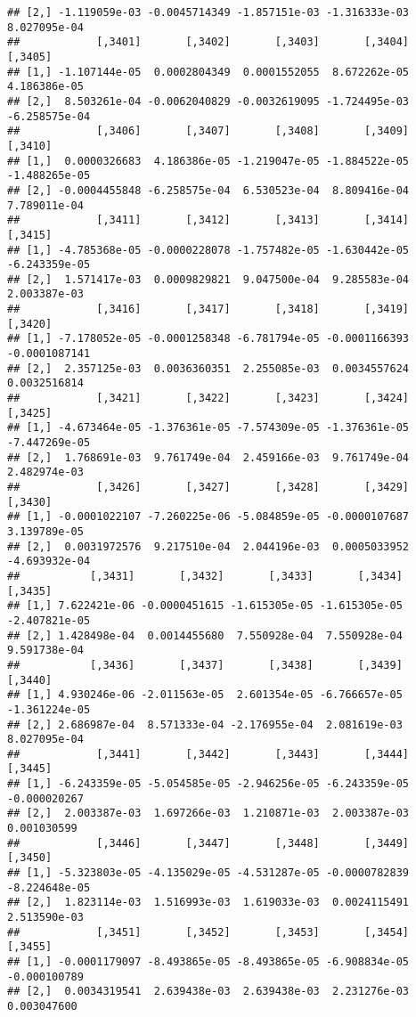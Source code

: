 \documentclass[
]{article}
\begin{document}
\begin{verbatim}
## [2,] -1.119059e-03 -0.0045714349 -1.857151e-03 -1.316333e-03  8.027095e-04
##            [,3401]       [,3402]       [,3403]       [,3404]       [,3405]
## [1,] -1.107144e-05  0.0002804349  0.0001552055  8.672262e-05  4.186386e-05
## [2,]  8.503261e-04 -0.0062040829 -0.0032619095 -1.724495e-03 -6.258575e-04
##            [,3406]       [,3407]       [,3408]       [,3409]       [,3410]
## [1,]  0.0000326683  4.186386e-05 -1.219047e-05 -1.884522e-05 -1.488265e-05
## [2,] -0.0004455848 -6.258575e-04  6.530523e-04  8.809416e-04  7.789011e-04
##            [,3411]       [,3412]       [,3413]       [,3414]       [,3415]
## [1,] -4.785368e-05 -0.0000228078 -1.757482e-05 -1.630442e-05 -6.243359e-05
## [2,]  1.571417e-03  0.0009829821  9.047500e-04  9.285583e-04  2.003387e-03
##            [,3416]       [,3417]       [,3418]       [,3419]       [,3420]
## [1,] -7.178052e-05 -0.0001258348 -6.781794e-05 -0.0001166393 -0.0001087141
## [2,]  2.357125e-03  0.0036360351  2.255085e-03  0.0034557624  0.0032516814
##            [,3421]       [,3422]       [,3423]       [,3424]       [,3425]
## [1,] -4.673464e-05 -1.376361e-05 -7.574309e-05 -1.376361e-05 -7.447269e-05
## [2,]  1.768691e-03  9.761749e-04  2.459166e-03  9.761749e-04  2.482974e-03
##            [,3426]       [,3427]       [,3428]       [,3429]       [,3430]
## [1,] -0.0001022107 -7.260225e-06 -5.084859e-05 -0.0000107687  3.139789e-05
## [2,]  0.0031972576  9.217510e-04  2.044196e-03  0.0005033952 -4.693932e-04
##           [,3431]       [,3432]       [,3433]       [,3434]       [,3435]
## [1,] 7.622421e-06 -0.0000451615 -1.615305e-05 -1.615305e-05 -2.407821e-05
## [2,] 1.428498e-04  0.0014455680  7.550928e-04  7.550928e-04  9.591738e-04
##           [,3436]       [,3437]       [,3438]       [,3439]       [,3440]
## [1,] 4.930246e-06 -2.011563e-05  2.601354e-05 -6.766657e-05 -1.361224e-05
## [2,] 2.686987e-04  8.571333e-04 -2.176955e-04  2.081619e-03  8.027095e-04
##            [,3441]       [,3442]       [,3443]       [,3444]      [,3445]
## [1,] -6.243359e-05 -5.054585e-05 -2.946256e-05 -6.243359e-05 -0.000020267
## [2,]  2.003387e-03  1.697266e-03  1.210871e-03  2.003387e-03  0.001030599
##            [,3446]       [,3447]       [,3448]       [,3449]       [,3450]
## [1,] -5.323803e-05 -4.135029e-05 -4.531287e-05 -0.0000782839 -8.224648e-05
## [2,]  1.823114e-03  1.516993e-03  1.619033e-03  0.0024115491  2.513590e-03
##            [,3451]       [,3452]       [,3453]       [,3454]      [,3455]
## [1,] -0.0001179097 -8.493865e-05 -8.493865e-05 -6.908834e-05 -0.000100789
## [2,]  0.0034319541  2.639438e-03  2.639438e-03  2.231276e-03  0.003047600

\end{verbatim}
\end{document}
